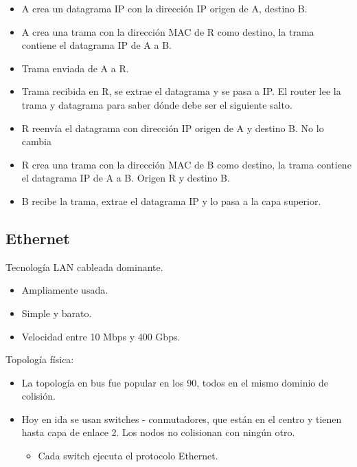 \documentclass[12pt, twoside, openright]{report} %
\begin{document}
\begin{itemize}
\begin{itemize}
\begin{itemize}
        \item A crea un datagrama IP con la dirección IP origen de A, destino B.
        \item A crea una trama con la dirección MAC de R como destino, la trama contiene el datagrama IP de A a B.
        \item Trama enviada de A a R.
        \item Trama recibida en R, se extrae el datagrama y se pasa a IP. El router lee la trama y datagrama para saber dónde debe ser el siguiente salto.
        \item R reenvía el datagrama con dirección IP origen de A y destino B. No lo cambia
        \item R crea una trama con la dirección MAC de B como destino, la trama contiene el datagrama IP de A a B. Origen R y destino B.
        \item B recibe la trama, extrae el datagrama IP y lo pasa a la capa superior.
        \end{itemize}
        \end{itemize}
      \end{itemize}


  

\subsection{Ethernet}

      Tecnología LAN cableada dominante.

      \begin{itemize}
      \item
        Ampliamente usada.
      \item
        Simple y barato.
      \item
        Velocidad entre 10 Mbps y 400 Gbps.
      \end{itemize}

      Topología física:

      \begin{itemize}
      \item
        La topología en bus fue popular en los 90, todos en el mismo
        dominio de colisión.
      \item
        Hoy en ida se usan switches - conmutadores, que están en el
        centro y tienen hasta capa de enlace 2. Los nodos no colisionan
        con ningún otro.

        \begin{itemize}
        \item
          Cada switch ejecuta el protocolo Ethernet.
        \end{itemize}
      \end{itemize}
\end{document}
